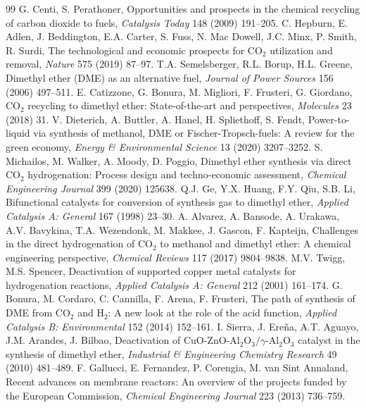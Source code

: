 \documentclass[12pt,a4paper]{article}
\begin{document}
\begin{thebibliography}{99}
 G. Centi, S. Perathoner, Opportunities and prospects in the chemical recycling of carbon dioxide to fuels, \textit{Catalysis Today} 148 (2009) 191--205.
 C. Hepburn, E. Adlen, J. Beddington, E.A. Carter, S. Fuss, N. Mac Dowell, J.C. Minx, P. Smith, R. Surdi, The technological and economic prospects for $\text{CO}_2$ utilization and removal, \textit{Nature} 575 (2019) 87--97.
 T.A. Semelsberger, R.L. Borup, H.L. Greene, Dimethyl ether (DME) as an alternative fuel, \textit{Journal of Power Sources} 156 (2006) 497--511.
 E. Catizzone, G. Bonura, M. Migliori, F. Frusteri, G. Giordano, $\text{CO}_2$ recycling to dimethyl ether: State-of-the-art and perspectives, \textit{Molecules} 23 (2018) 31.
 V. Dieterich, A. Buttler, A. Hanel, H. Spliethoff, S. Fendt, Power-to-liquid via synthesis of methanol, DME or Fischer-Tropsch-fuels: A review for the green economy, \textit{Energy \& Environmental Science} 13 (2020) 3207--3252.
 S. Michailos, M. Walker, A. Moody, D. Poggio, Dimethyl ether synthesis via direct $\text{CO}_2$ hydrogenation: Process design and techno-economic assessment, \textit{Chemical Engineering Journal} 399 (2020) 125638.
 Q.J. Ge, Y.X. Huang, F.Y. Qiu, S.B. Li, Bifunctional catalysts for conversion of synthesis gas to dimethyl ether, \textit{Applied Catalysis A: General} 167 (1998) 23--30.
 A. Alvarez, A. Bansode, A. Urakawa, A.V. Bavykina, T.A. Wezendonk, M. Makkee, J. Gascon, F. Kapteijn, Challenges in the direct hydrogenation of $\text{CO}_2$ to methanol and dimethyl ether: A chemical engineering perspective, \textit{Chemical Reviews} 117 (2017) 9804--9838.
 M.V. Twigg, M.S. Spencer, Deactivation of supported copper metal catalysts for hydrogenation reactions, \textit{Applied Catalysis A: General} 212 (2001) 161--174.
 G. Bonura, M. Cordaro, C. Cannilla, F. Arena, F. Frusteri, The path of synthesis of DME from $\text{CO}_2$ and $\text{H}_2$: A new look at the role of the acid function, \textit{Applied Catalysis B: Environmental} 152 (2014) 152--161.
 I. Sierra, J. Ere\~na, A.T. Aguayo, J.M. Arandes, J. Bilbao, Deactivation of $\text{CuO-ZnO-Al}_2\text{O}_3/\gamma\text{-Al}_2\text{O}_3$ catalyst in the synthesis of dimethyl ether, \textit{Industrial \& Engineering Chemistry Research} 49 (2010) 481--489.
 F. Gallucci, E. Fernandez, P. Corengia, M. van Sint Annaland, Recent advances on membrane reactors: An overview of the projects funded by the European Commission, \textit{Chemical Engineering Journal} 223 (2013) 736--759.

\end{thebibliography}
\end{document}
